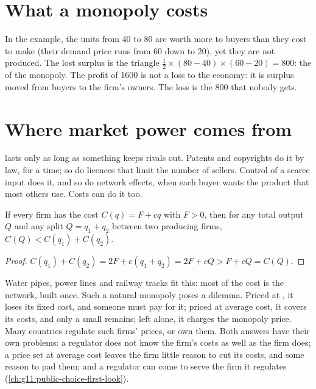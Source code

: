 \section{What a monopoly costs}\label{sec:g11:monopoly:dwl}

In the example, the units from 40 to 80 are worth more to buyers than they cost to make (their demand price runs from 60 down to 20), yet they are not produced.
The lost surplus is the triangle $\tfrac12 \times (80 - 40) \times (60 - 20) = 800$: the  of the monopoly. The profit of 1600 is not a loss to the
economy: it is surplus moved from buyers to the firm's owners. The loss is the 800 that nobody gets.

\section{Where market power comes from}\label{sec:g11:monopoly:sources}

 lasts only as long as something keeps rivals out. Patents and copyrights do it by law, for a time; so do licences that limit the number of
sellers. Control of a scarce input does it, and so do network effects, when each buyer wants the product that most others use. Costs can do it too.

\begin{proposition}\label{prop:g11:monopoly:natural}
If every firm has the cost $C(q) = F + cq$ with $F > 0$, then for any total output $Q$ and any split $Q = q_1 + q_2$ between two producing firms, $C(Q) < C(q_1) +
C(q_2)$.
\end{proposition}
\begin{proof}
$C(q_1) + C(q_2) = 2F + c(q_1 + q_2) = 2F + cQ > F + cQ = C(Q)$.
\end{proof}

Water pipes, power lines and railway tracks fit this: most of the cost is the network, built once. Such a natural monopoly poses a dilemma. Priced at ,
it loses its fixed cost, and someone must pay for it; priced at average cost, it covers its costs, and only a small  remains; left alone, it charges
the monopoly price. Many countries regulate such firms' prices, or own them. Both answers have their own problems: a regulator does not know
the firm's costs as well as the firm does; a price set at average cost leaves the firm little reason to cut its costs, and some reason to pad
them; and a regulator can come to serve the firm it regulates (\cref{ch:g11:public-choice-first-look}).

